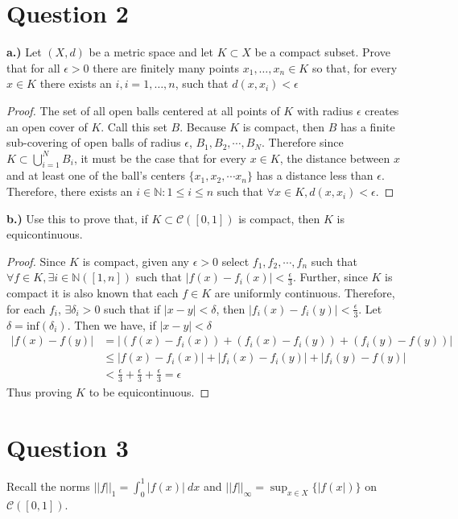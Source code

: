 \documentclass[12pt, letterpaper]{article}
\begin{document}
\section*{Question 2}
\noindent\textbf{a.)} Let $(X,d)$ be a metric space and let $K\subset X$ be a compact subset.  Prove that for all $\epsilon >0$ there are finitely many points $x_1,\dots,x_n\in K$ so that, for every $x\in K$ there exists an $i, i= 1,\dots,n$, such that $d(x,x_i) < \epsilon$
\begin{proof}
  The set of all open balls centered at all points of $K$ with radius $\epsilon$ creates an open cover of $K$. Call this set $B$. Because $K$ is compact, then $B$ has a finite sub-covering of open balls of radius $\epsilon$, $B_1, B_2, \cdots, B_N$. Therefore since $K \subset \bigcup\limits_{i=1}^{N}B_i$, it must be the case that for every $x \in K$, the distance between $x$ and at least one of the ball's centers $\{x_1, x_2, \cdots x_n \}$ has a distance less than $\epsilon$. Therefore, there exists an $i \in \mathbb{N} : 1 \leq i \leq n$ such that $\forall x \in K, d(x, x_i) < \epsilon$.
\end{proof}
\noindent\textbf{b.)} Use this to prove that, if $K\subset \mathcal{C}([0,1])$ is compact, then $K$ is equicontinuous.
\begin{proof}
  Since $K$ is compact, given any $\epsilon > 0$ select $f_1, f_2, \cdots, f_n$ such that $\forall f \in K, \exists i \in \mathbb{N}([1, n])$ such that $|f(x) - f_i(x)| < \frac{\epsilon}{3}$. Further, since $K$ is compact it is also known that each $f\in K$ are uniformly continuous. Therefore, for each $f_i$, $\exists \delta_i >0$ such that if $|x - y| < \delta$, then $|f_i(x) - f_i(y)| < \frac{\epsilon}{3}$. Let $\delta = \text{inf}(\delta_i)$. Then we have, if $|x-y| < \delta$
  \begin{align*}
    |f(x)- f(y)| &= |(f(x) - f_i(x))+(f_i(x) -f_i(y))+(f_i(y) - f(y))| \\
    &\leq |f(x) - f_i(x)|+|f_i(x) -f_i(y)|+|f_i(y) - f(y)| \\
    &< \frac{\epsilon}{3} + \frac{\epsilon}{3} + \frac{\epsilon}{3} = \epsilon
  \end{align*}
  Thus proving $K$ to be equicontinuous.
\end{proof}
\pagebreak
\section*{Question 3}
Recall the norms $||f||_1 = \int_0^1|f(x)| \ dx$ and $||f||_\infty= \sup_{x\in X} \{|f(x|)\}$ on $\mathcal{C}([0,1])$.\\
\end{document}
